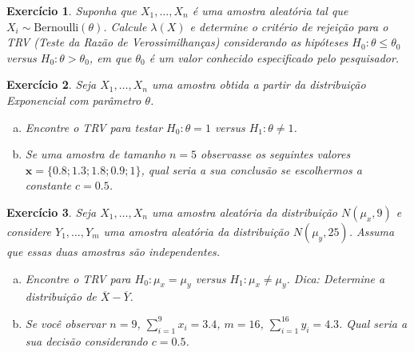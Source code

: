 \documentclass[letter,11pt]{article}
\newtheorem{exer}{Exercício}
\begin{document}
% 
% 
% 
% 


\begin{exer} \rm Suponha que $X_1, \ldots, X_n$ é uma amostra aleatória tal que $X_i \sim \mbox{Bernoulli}(\theta)$. Calcule $\lambda(X)$ e determine o critério de rejeição para o TRV (Teste da Razão de Verossimilhanças) considerando as hipóteses $H_0: \theta \leq \theta_0 $ versus $H_0: \theta > \theta_0 $, em que $\theta_0$ é um valor conhecido especificado pelo pesquisador.
\end{exer}


\begin{exer} \rm Seja $X_1, \ldots, X_n$ uma amostra obtida a partir da distribuição Exponencial com parâmetro $\theta$.

\begin{enumerate}[a)]
\item Encontre o TRV para testar $H_0: \theta = 1$ versus $H_1: \theta \neq 1$.

\item Se uma amostra de tamanho $n=5$ observasse os seguintes valores $\textbf{x}=\{0.8; 1.3; 1.8; 0.9; 1\}$, qual seria a sua conclusão se escolhermos a constante $c=0.5$.

\end{enumerate}
\end{exer}


\begin{exer} \rm Seja $X_1, \ldots, X_n$ uma amostra aleatória da distribuição $N(\mu_x, 9)$ e considere $Y_1, \ldots, Y_m$ uma amostra aleatória da distribuição $N(\mu_y, 25)$. Assuma que essas duas amostras são independentes.

\begin{enumerate}[a)]
\item Encontre o TRV para $H_0: \mu_x=\mu_y$ versus $H_1: \mu_x\neq \mu_y$. Dica: Determine a distribuição de $\overline{X}-\overline{Y}$.

\item Se você observar $n=9$, $\sum_{i=1}^9 x_i=3.4$, $m=16$, $\sum_{i=1}^{16} y_i=4.3$. Qual seria a sua decisão considerando $c=0.5$.
\end{enumerate}
\end{exer}
\end{document}
